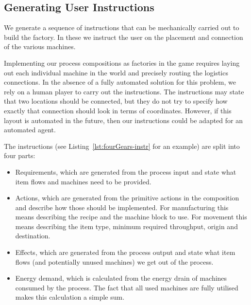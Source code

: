 \documentclass[class=smolathesis,crop=false]{standalone}
\begin{document}
\subsection{Generating User Instructions}
\label{sec:cases/factorio/instr}

We generate a sequence of instructions that can be mechanically carried out to build the factory.
In these we instruct the user on the placement and connection of the various machines.

Implementing our process compositions as factories in the game requires laying out each individual machine in the world and precisely routing the logistics connections.
In the absence of a fully automated solution for this problem, we rely on a human player to carry out the instructions.
The instructions may state that two locations should be connected, but they do not try to specify how exactly that connection should look in terms of coordinates.
However, if this layout is automated in the future, then our instructions could be adapted for an automated agent.

The instructions (see Listing~\ref{lst:fourGears-instr} for an example) are split into four parts:
\begin{itemize}
  \item Requirements, which are generated from the process input and state what item flows and machines need to be provided.
  \item Actions, which are generated from the primitive actions in the composition and describe how those should be implemented.
    For manufacturing this means describing the recipe and the machine block to use.
    For movement this means describing the item type, minimum required throughput, origin and destination.
  \item Effects, which are generated from the process output and state what item flows (and potentially unused machines) we get out of the process.
  \item Energy demand, which is calculated from the energy drain of machines consumed by the process.
    The fact that all used machines are fully utilised makes this calculation a simple sum.
\end{itemize}
\end{document}
